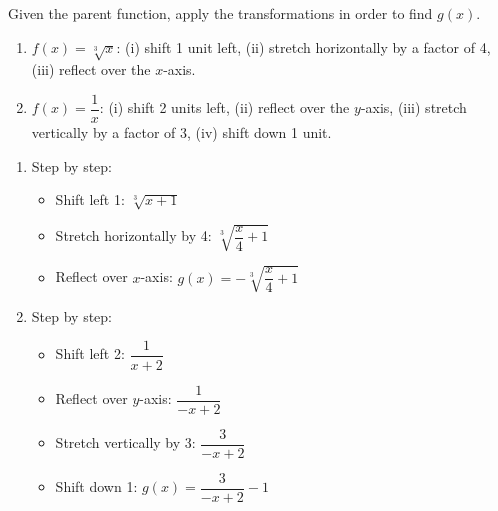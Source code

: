 \documentclass{ximera}
\begin{document}
\begin{problem}
Given the parent function, apply the transformations in order to find $g(x)$.
\begin{enumerate}
  \item[(a)] $f(x) = \sqrt[3]{x}$: (i) shift 1 unit left, (ii) stretch horizontally by a factor of 4, (iii) reflect over the $x$-axis.
  \medskip
  \item[(b)] $f(x) = \dfrac{1}{x}$: (i) shift 2 units left, (ii) reflect over the $y$-axis, (iii) stretch vertically by a factor of 3, (iv) shift down 1 unit.
\end{enumerate}

\begin{solution}
\begin{enumerate}
  \item[(a)] Step by step:
  \begin{itemize}
    \item Shift left 1: $\sqrt[3]{x+1}$
    \item Stretch horizontally by 4: $\sqrt[3]{\dfrac{x}{4}+1}$
    \item Reflect over $x$-axis: $g(x) = -\sqrt[3]{\dfrac{x}{4}+1}$
  \end{itemize}

\begin{center}
\end{center}

  \item[(b)] Step by step:
  \begin{itemize}
    \item Shift left 2: $\dfrac{1}{x+2}$
    \item Reflect over $y$-axis: $\dfrac{1}{-x+2}$
    \item Stretch vertically by 3: $\dfrac{3}{-x+2}$
    \item Shift down 1: $g(x) = \dfrac{3}{-x+2} - 1$
  \end{itemize}


\end{enumerate}
\end{solution}
\end{problem}
\end{document}
